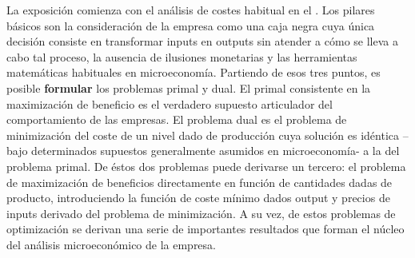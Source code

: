 \documentclass{nuevotema}
\begin{document}
La exposición comienza con el análisis de costes habitual en el . Los pilares básicos son la consideración de la empresa como una caja negra cuya única decisión consiste en transformar inputs en outputs sin atender a cómo se lleva a cabo tal proceso, la ausencia de ilusiones monetarias y las herramientas matemáticas habituales en microeconomía. Partiendo de esos tres puntos, es posible \textbf{formular} los problemas primal y dual. El primal consistente en la maximización de beneficio es el verdadero supuesto articulador del comportamiento de las empresas. El problema dual es el problema de minimización del coste de un nivel dado de producción cuya solución es idéntica --bajo determinados supuestos generalmente asumidos en microeconomía- a la del problema primal. De éstos dos problemas puede derivarse un tercero: el problema de maximización de beneficios directamente en función de cantidades dadas de producto, introduciendo la función de coste mínimo dados output y precios de inputs derivado del problema de minimización. A su vez, de estos problemas de optimización se derivan una serie de importantes resultados que forman el núcleo del análisis microeconómico de la empresa. 
\end{document}
